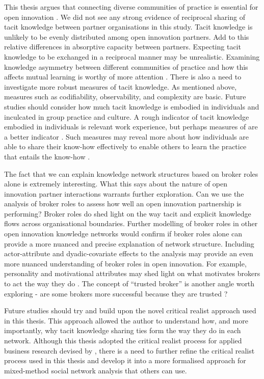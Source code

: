 This thesis argues that connecting diverse communities of practice is essential for open innovation \citep{brown2001knowledge}. We did not see any strong evidence of reciprocal sharing of tacit knowledge between partner organisations in this study. Tacit knowledge is unlikely to be evenly distributed among open innovation partners. Add to this relative differences in absorptive capacity between partners. Expecting tacit knowledge to be exchanged in a reciprocal manner may be unrealistic. Examining knowledge asymmetry between different communities of practice and how this affects mutual learning is worthy of more attention \citep{liu2021more}. There is also a need to investigate more robust measures of tacit knowledge. As mentioned above, measures such as codifiability, observability, and complexity are basic. Future studies should consider how much tacit knowledge is embodied in individuals and inculcated in group practice and culture. A rough indicator of tacit knowledge embodied in individuals is relevant work experience, but perhaps measures of  are a better indicator \citep{hedlund2002tacit}. Such measures may reveal more about how individuals are able to share their know-how effectively to enable others to learn the practice that entails the know-how \citep{van1986central, cook1999bridging}. \medskip 

The fact that we can explain knowledge network structures based on broker roles alone is extremely interesting. What this says about the nature of open innovation partner interactions warrants further exploration. Can we use the analysis of broker roles to assess how well an open innovation partnership is performing? Broker roles do shed light on the way tacit and explicit knowledge flows across organisational boundaries. Further modelling of broker roles in other open innovation knowledge networks would confirm if broker roles alone can provide a more nuanced and precise explanation of network structure. Including actor-attribute and dyadic-covariate effects to the analysis may provide an even more nuanced understanding of broker roles in open innovation. For example, personality and motivational attributes may shed light on what motivates brokers to act the way they do \citep{davis2010agency}. The concept of \enquote{trusted broker} is another angle worth exploring - are some brokers more successful because they are trusted \citep{long2013bridges,kwon2020network}? 

Future studies should try and build upon the novel critical realist approach used in this thesis. This approach allowed the author to understand how, and more importantly, why tacit knowledge sharing ties form the way they do in each network. Although this thesis adopted the critical realist process for applied business research devised by \citet{mcavoy2018critical}, there is a need to further refine the critical realist process used in this thesis and develop it into a more formalised approach for mixed-method social network analysis that others can use. 

